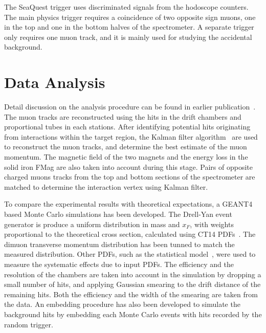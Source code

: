 \documentclass[reprint,aps,unsortedaddress,superscriptaddress,prl,floatfix,showpacs,linenumbers,final]{revtex4-2}
\begin{document}

The SeaQuest trigger uses discriminated signals from the hodoscope counters.
The main physics trigger requires a coincidence of two opposite sign muons,
one in the top and one in the bottom halves of the spectrometer.
A separate trigger only requires one muon track, and it is mainly used for studying the accidental background.

\section{Data Analysis}
\label{sec:analysis}
Detail discussion on the analysis procedure can be found in earlier publication~\cite{dove2021,dove2023}.
The muon tracks are reconstructed using the hits in the drift chambers and proportional tubes in each stations.
After identifying potential hits originating from interactions within the target region,
the Kalman filter algorithm~\cite{kalman1960} are used to reconstruct the muon tracks,
and determine the best estimate of the muon momentum.
The magnetic field of the two magnets and the energy loss in the solid iron FMag are also taken into account during this stage.
Pairs of opposite charged muons tracks from the top and bottom sections of the spectrometer are
matched to determine the interaction vertex using Kalman filter.

To compare the experimental results with theoretical expectations,
a GEANT4~\cite{agostinelli2003,allison2006,allison2016} based Monte Carlo simulations has been developed.
The Drell-Yan event generator is produce a uniform distribution in mass and $x_F$,
with weights proportional to the theoretical cross section, calculated using CT14 PDFs~\cite{hou2018}.
The dimuon transverse momentum distribution has been tunned to match the measured distribution.
Other PDFs, such as the statistical model~\cite{soffer2019}, were used to measure the systematic effects due to input PDFs.
The efficiency and the resolution of the chambers are taken into account in the simulation
by dropping a small number of hits, and applying Gaussian smearing to the drift distance of the remaining hits.
Both the efficiency and the width of the smearing are taken from the data.
An embedding procedure has also been developed to simulate the background hits by embedding each Monte Carlo events
with hits recorded by the random trigger.
\end{document}
